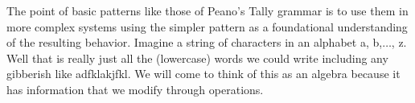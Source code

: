 The point of basic patterns like those of Peano's Tally grammar is to use them
in more complex systems using the simpler pattern as a foundational
understanding of the resulting behavior. Imagine a string of characters in an
alphabet a, b,$\ldots$, z.  Well that is really just all the (lowercase) words
we could write including any gibberish like adfklakjfkl.  We will come to think
of this as an algebra because it has information that we modify through operations.
